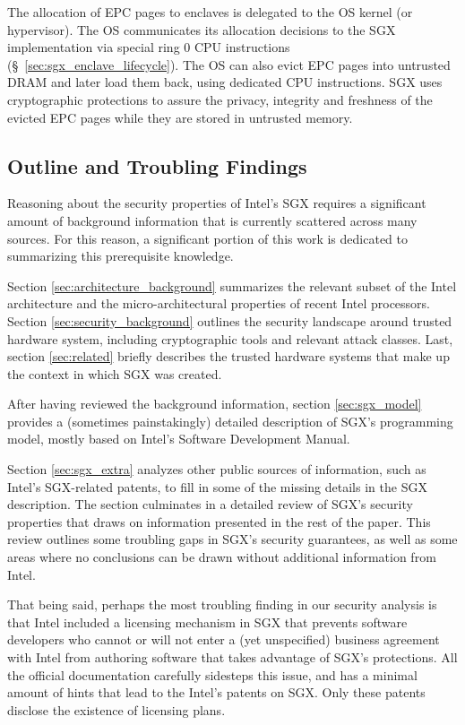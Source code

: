 The allocation of EPC pages to enclaves is delegated to the OS kernel (or
hypervisor). The OS communicates its allocation decisions to the SGX
implementation via special ring 0 CPU instructions
(\S~\ref{sec:sgx_enclave_lifecycle}). The OS can also evict EPC pages into
untrusted DRAM and later load them back, using dedicated CPU instructions. SGX
uses cryptographic protections to assure the privacy, integrity and freshness
of the evicted EPC pages while they are stored in untrusted memory.


\subsection{Outline and Troubling Findings}
\label{sec:intro_troubles}

Reasoning about the security properties of Intel's SGX requires a significant
amount of background information that is currently scattered across many
sources. For this reason, a significant portion of this work is dedicated to
summarizing this prerequisite knowledge.

Section \ref{sec:architecture_background} summarizes the relevant subset of the
Intel architecture and the micro-architectural properties of recent Intel
processors. Section \ref{sec:security_background} outlines the security
landscape around trusted hardware system, including cryptographic tools and
relevant attack classes. Last, section \ref{sec:related} briefly describes the
trusted hardware systems that make up the context in which SGX was created.

After having reviewed the background information, section \ref{sec:sgx_model}
provides a (sometimes painstakingly) detailed description of SGX's programming
model, mostly based on Intel's Software Development Manual.

Section \ref{sec:sgx_extra} analyzes other public sources of information, such
as Intel's SGX-related patents, to fill in some of the missing details in the
SGX description. The section culminates in a detailed review of SGX's security
properties that draws on information presented in the rest of the paper. This
review outlines some troubling gaps in SGX's security guarantees, as well as
some areas where no conclusions can be drawn without additional information
from Intel.

That being said, perhaps the most troubling finding in our security analysis is
that Intel included a licensing mechanism in SGX that prevents software
developers who cannot or will not enter a (yet unspecified) business agreement
with Intel from authoring software that takes advantage of SGX's protections.
All the official documentation carefully sidesteps this issue, and has a
minimal amount of hints that lead to the Intel's patents on SGX. Only these
patents disclose the existence of licensing plans.

